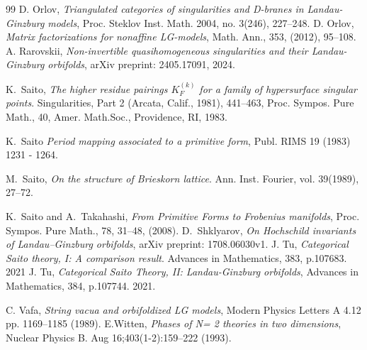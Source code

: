 \documentclass[reqno,12pt]{amsart}
\numberwithin{equation}{section}
\theoremstyle{plain}
\theoremstyle{definition}
\numberwithin{equation}{section}
\begin{document}
\begin{thebibliography}{99}
    D. Orlov, \emph{Triangulated categories of singularities and D-branes in Landau- Ginzburg models}, Proc. Steklov Inst. Math. 2004, no. 3(246), 227–248.
    D. Orlov, \emph{Matrix factorizations for nonaffine LG-models}, Math. Ann., 353, (2012), 95–108.
    A. Rarovskii, 
    \emph{Non-invertible quasihomogeneous singularities and their Landau-Ginzburg orbifolds}, arXiv preprint: 2405.17091, 2024.

    K.~Saito, 
    {\it The higher residue pairings $K_F^{(k)}$ for a family of hypersurface singular points}. 
    Singularities, Part 2 (Arcata, Calif., 1981), 441–463, Proc. Sympos. Pure Math., 40, Amer. Math.Soc., Providence, RI, 1983.

	K.~Saito
	{\it Period mapping associated to a primitive form}, Publ. RIMS 19 (1983) 1231 - 1264. 
	
    M.~Saito, {\it On the structure of Brieskorn lattice}. Ann. Inst. Fourier, vol. 39(1989), 27–72.

	K.~Saito and A.~Takahashi,
	{\it From Primitive Forms to Frobenius manifolds}, 
	Proc. Sympos. Pure Math., 78, 31--48, (2008).
	D.~Shklyarov, \emph{On Hochschild invariants of Landau--Ginzburg orbifolds}, arXiv preprint: 1708.06030v1.
    J. Tu, \emph{Categorical Saito theory, I: A comparison result}. Advances in Mathematics, 383, p.107683. 2021
    J. Tu, \emph{Categorical Saito Theory, II: Landau-Ginzburg orbifolds},  Advances in Mathematics, 384, p.107744. 2021.

    C. Vafa, \emph{String vacua and orbifoldized LG models}, Modern Physics Letters A 4.12 pp. 1169–1185 (1989).
    E.Witten, \emph{Phases of N= 2 theories in two dimensions}, Nuclear Physics B. Aug 16;403(1-2):159–222 (1993).


\end{thebibliography}
\end{document}
